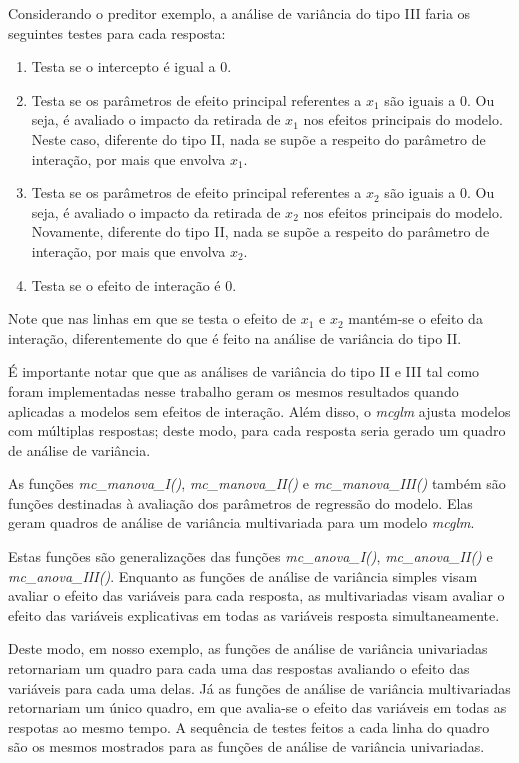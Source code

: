 Considerando o preditor exemplo, a análise de variância do tipo III faria os seguintes testes para cada resposta:

\begin{enumerate}
  \item Testa se o intercepto é igual a 0.
  
  \item Testa se os parâmetros de efeito principal referentes a $x_1$ são iguais a 0. Ou seja, é avaliado o impacto da retirada de $x_1$ nos efeitos principais do modelo. Neste caso, diferente do tipo II, nada se supõe a respeito do parâmetro de interação, por mais que envolva $x_1$.
  
  \item Testa se os parâmetros de efeito principal referentes a $x_2$ são iguais a 0. Ou seja, é avaliado o impacto da retirada de $x_2$ nos efeitos principais do modelo. Novamente, diferente do tipo II, nada se supõe a respeito do parâmetro de interação, por mais que envolva $x_2$.
  
  \item Testa se o efeito de interação é 0.
\end{enumerate}

Note que nas linhas em que se testa o efeito de $x_1$ e $x_2$ mantém-se o efeito da interação, diferentemente do que é feito na análise de variância do tipo II.

É importante notar que que as análises de variância do tipo II e III tal como foram implementadas nesse trabalho geram os mesmos resultados quando aplicadas a modelos sem efeitos de interação. Além disso, o \emph{mcglm} ajusta modelos com múltiplas respostas; deste modo, para cada resposta seria gerado um quadro de análise de variância. 

As funções \emph{mc\_manova\_I()}, \emph{mc\_manova\_II()} e \emph{mc\_manova\_III()} também são funções destinadas à avaliação dos parâmetros de regressão do modelo. Elas geram quadros de análise de variância multivariada para um modelo \emph{mcglm}. 

Estas funções são generalizações das funções \emph{mc\_anova\_I()}, \emph{mc\_anova\_II()} e \emph{mc\_anova\_III()}. Enquanto as funções de análise de variância simples visam avaliar o efeito das variáveis para cada resposta, as multivariadas visam avaliar o efeito das variáveis explicativas em todas as variáveis resposta simultaneamente. 

Deste modo, em nosso exemplo, as funções de análise de variância univariadas retornariam um quadro para cada uma das respostas avaliando o efeito das variáveis para cada uma delas. Já as funções de análise de variância multivariadas retornariam um único quadro, em que avalia-se o efeito das variáveis em todas as respotas ao mesmo tempo. A sequência de testes feitos a cada linha do quadro são os mesmos mostrados para as funções de análise de variância univariadas.

